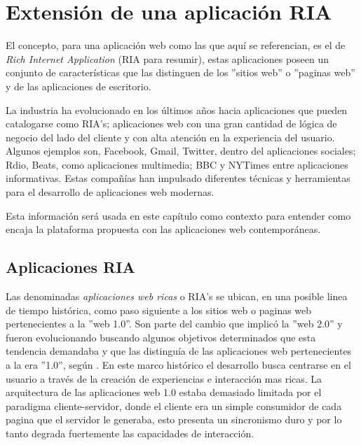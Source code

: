 
\chapter{Extensi\'{o}n de una aplicaci\'{o}n RIA} %

\label{ch:ria_extension} 

El concepto, para una aplicación web como las que aquí se referencian, es el de \emph{Rich Internet Application} (RIA para resumir), estas aplicaciones poseen un conjunto de características que las distinguen de los ''sitios web'' o ''paginas web'' y de las aplicaciones de escritorio. 

La industria ha evolucionado en los últimos años hacia aplicaciones que pueden catalogarse como RIA's; aplicaciones web con una gran cantidad de lógica de negocio del lado del cliente y con alta atención en la experiencia del usuario. Algunos ejemplos son, Facebook, Gmail, Twitter, dentro del aplicaciones sociales; Rdio, Beats, como aplicaciones multimedia; BBC y NYTimes entre aplicaciones informativas. Estas compañías han impulsado diferentes técnicas y herramientas para el desarrollo de aplicaciones web modernas. 

Esta información será usada en este capítulo como contexto para entender como encaja la plataforma propuesta con las aplicaciones web contemporáneas.

\section{Aplicaciones RIA} \label{sec:extension_ria_intro}

Las denominadas \emph{aplicaciones web ricas} o RIA's se ubican, en una posible linea de tiempo histórica, como paso siguiente a los sitios web o paginas web pertenecientes a la ''web 1.0''. Son parte del cambio que implicó la ''web 2.0'' y fueron evolucionando buscando algunos objetivos determinados que esta tendencia demandaba y que las distinguía de las aplicaciones web pertenecientes a la era ''1.0'', según \citet{Farrell2007}. En este marco histórico el desarrollo busca centrarse en el usuario a través de la creación de experiencias e interacción mas ricas. La arquitectura de las aplicaciones web 1.0 estaba demasiado limitada por el paradigma cliente-servidor, donde el cliente era un simple consumidor de cada pagina que el servidor le generaba, esto presenta un sincronismo duro y por lo tanto degrada fuertemente las capacidades de interacción.


